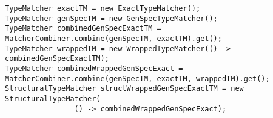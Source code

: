 \begin{lstlisting}[style = java, caption = Default-Instanziierung des StructuralTypeMatchers im DesiredComponentFinder, captionpos = b, label = lst_matchermanager]
TypeMatcher exactTM = new ExactTypeMatcher();
TypeMatcher genSpecTM = new GenSpecTypeMatcher();
TypeMatcher combinedGenSpecExactTM = MatcherCombiner.combine(genSpecTM, exactTM).get();
TypeMatcher wrappedTM = new WrappedTypeMatcher(() -> combinedGenSpecExactTM);
TypeMatcher combinedWrappedGenSpecExact = MatcherCombiner.combine(genSpecTM, exactTM, wrappedTM).get();
StructuralTypeMatcher structWrappedGenSpecExactTM = new StructuralTypeMatcher(
				() -> combinedWrappedGenSpecExact);
\end{lstlisting}